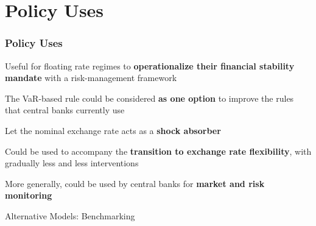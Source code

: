 \documentclass{beamer}
\newenvironment{wideitemize}{\itemize\addtolength{\itemsep}{10pt}}{\enditemize}
\newenvironment{wideenumerate}{\enumerate\addtolength{\itemsep}{10pt}}{\endenumerate}
\begin{document}
\section{Policy Uses}

\begin{frame}
  \frametitle{Policy Uses}
  \begin{wideitemize}
   \item Useful for floating rate regimes to \textbf{operationalize their financial
     stability mandate} with a risk-management framework
    \item The VaR-based rule could be considered \textbf{as one option} to improve the
      rules that central banks currently use
    \item Let the nominal exchange rate acts as a \textbf{shock absorber}
    \item Could be used to accompany the \textbf{transition to exchange rate
        flexibility}, with gradually less and less interventions
  \item More generally, could be used by central banks for \textbf{market and risk monitoring}
  \end{wideitemize}
\end{frame}




\begin{frame}{Alternative Models: Benchmarking}
\setlength\tabcolsep{2pt}  %
\tiny  %

\normalsize
\end{frame}



\end{document}
